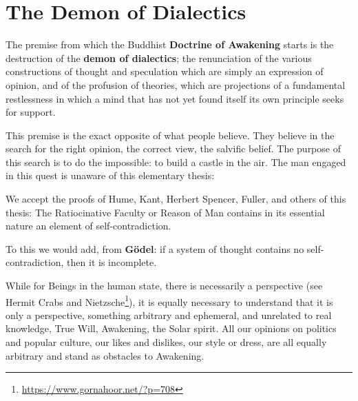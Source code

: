 \section{The Demon of Dialectics}

\begin{quotex}
The premise from which the Buddhist \textbf{Doctrine of Awakening} starts is the destruction of the \textbf{demon of dialectics}; the renunciation of the various constructions of thought and speculation which are simply an expression of opinion, and of the profusion of theories, which are projections of a fundamental restlessness in which a mind that has not yet found itself its own principle seeks for support.

\end{quotex}

This premise is the exact opposite of what people believe. They believe in the search for the right opinion, the correct view, the salvific belief. The purpose of this search is to do the impossible: to build a castle in the air. The man engaged in this quest is unaware of this elementary thesis: 

\begin{quotex}
We accept the proofs of Hume, Kant, Herbert Spencer, Fuller, and others of this thesis: The Ratiocinative Faculty or Reason of Man contains in its essential nature an element of self-contradiction.

\end{quotex}

To this we would add, from \textbf{Gödel}: if a system of thought contains no self-contradiction, then it is incomplete. 

While for Beings in the human state, there is necessarily a perspective (see Hermit Crabs and Nietzsche\footnote{\url{https://www.gornahoor.net/?p=708}}), it is equally necessary to understand that it is only a perspective, something arbitrary and ephemeral, and unrelated to real knowledge, True Will, Awakening, the Solar spirit. All our opinions on politics and popular culture, our likes and dislikes, our style or dress, are all equally arbitrary and stand as obstacles to Awakening. 

